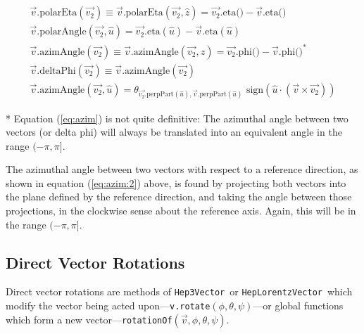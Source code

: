 \documentclass[twoside,12pt]{article}
\def \SV {{\tt Hep3Vector}}
\def \LV {{\tt HepLorentzVector}}
\begin{document}
\begin{eqnarray}
    \label{eq:polarA} \\
  \vec{v}\mbox{.polarEta} (\vec{v_2})
    \equiv \vec{v}\mbox{.polarEta} (\vec{v_2}, \hat{z}) =
    \vec{v_2}\mbox{.eta()} - \vec{v}\mbox{.eta()}
    \label{eq:polarEta} \\
  \vec{v}\mbox{.polarAngle} (\vec{v_2}, \hat{u}) =
    \vec{v_2}\mbox{.eta}(\hat{u}) - \vec{v}\mbox{.eta}(\hat{u})
    \label{eq:polarA:2} \\
  \vec{v}\mbox{.azimAngle} (\vec{v_2})
    \equiv \vec{v}\mbox{.azimAngle} (\vec{v_2}, \hat{z}) =
    \vec{v_2}\mbox{.phi()} - \vec{v}\mbox{.phi()} ^*
    \label{eq:azim} \\
  \vec{v}\mbox{.deltaPhi} (\vec{v_2})
    \equiv \vec{v}\mbox{.azimAngle} (\vec{v_2}) 
    \label{eq:deltaPhi} \\
  \vec{v}\mbox{.azimAngle} (\vec{v_2}, \hat{u}) =
    \theta_{\vec{v_2}\mbox{.perpPart}(\hat{u}),
    \vec{v}\mbox{.perpPart}(\hat{u})}
    \mbox{ sign} \left( \hat{u} \cdot (\vec{v} \times \vec{v_2}) \right)
    \label{eq:azim:2}
\end{eqnarray}

\noindent

* Equation (\ref{eq:azim}) is not quite definitive:  
The azimuthal angle between two vectors (or delta phi)
will always be translated into an 
equivalent angle in the range $(-\pi,\pi]$.

The azimuthal angle between two vectors with respect to a reference direction,
as shown in equation (\ref{eq:azim:2}) above, is found by
projecting both vectors into the plane defined by the reference direction,
and taking the angle between those projections, in the clockwise sense about
the reference axis.  Again, this will be in the range $(-\pi,\pi]$.

\subsection{Direct Vector Rotations}
\label{rotations}

Direct vector rotations are methods of \SV\ or \LV\ which
modify the vector being acted
upon---{\tt v.rotate}$(\phi, \theta, \psi)$---or
global functions which form a new
vector---{\tt rotationOf}$(\vec{v}, \phi, \theta, \psi)$.
\end{document}
